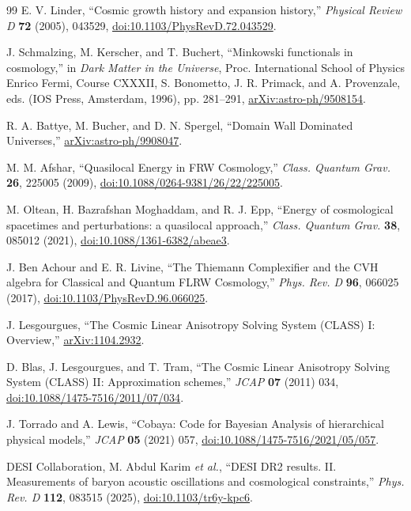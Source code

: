\documentclass[aps,prd,preprint,onecolumn,nofootinbib,superscriptaddress,showkeys]{revtex4-2}
\numberwithin{equation}{section}
\theoremstyle{definition}
\theoremstyle{plain}
\begin{document}
\begin{thebibliography}{99}
E. V. Linder, ``Cosmic growth history and expansion history,''
\emph{Physical Review D} \textbf{72} (2005), 043529,
\href{https://doi.org/10.1103/PhysRevD.72.043529}{doi:10.1103/PhysRevD.72.043529}.



J. Schmalzing, M. Kerscher, and T. Buchert,
``Minkowski functionals in cosmology,'' in \emph{Dark Matter in the Universe},
Proc. International School of Physics Enrico Fermi, Course CXXXII,
S. Bonometto, J. R. Primack, and A. Provenzale, eds. (IOS Press, Amsterdam, 1996), pp. 281--291,
\href{https://arxiv.org/abs/astro-ph/9508154}{arXiv:astro-ph/9508154}.

R. A. Battye, M. Bucher, and D. N. Spergel,
``Domain Wall Dominated Universes,''
\href{https://arxiv.org/abs/astro-ph/9908047}{arXiv:astro-ph/9908047}.

M. M. Afshar,
``Quasilocal Energy in FRW Cosmology,''
\emph{Class. Quantum Grav.} \textbf{26}, 225005 (2009),
\href{https://doi.org/10.1088/0264-9381/26/22/225005}{doi:10.1088/0264-9381/26/22/225005}.

M. Oltean, H. Bazrafshan Moghaddam, and R. J. Epp,
``Energy of cosmological spacetimes and perturbations: a quasilocal approach,''
\emph{Class. Quantum Grav.} \textbf{38}, 085012 (2021),
\href{https://doi.org/10.1088/1361-6382/abeae3}{doi:10.1088/1361-6382/abeae3}.

J. Ben Achour and E. R. Livine,
``The Thiemann Complexifier and the CVH algebra for Classical and Quantum FLRW Cosmology,''
\emph{Phys. Rev. D} \textbf{96}, 066025 (2017),
\href{https://doi.org/10.1103/PhysRevD.96.066025}{doi:10.1103/PhysRevD.96.066025}.

J. Lesgourgues,
``The Cosmic Linear Anisotropy Solving System (CLASS) I: Overview,''
\href{https://arxiv.org/abs/1104.2932}{arXiv:1104.2932}.

D. Blas, J. Lesgourgues, and T. Tram,
``The Cosmic Linear Anisotropy Solving System (CLASS) II: Approximation schemes,''
\emph{JCAP} \textbf{07} (2011) 034,
\href{https://doi.org/10.1088/1475-7516/2011/07/034}{doi:10.1088/1475-7516/2011/07/034}.

J. Torrado and A. Lewis,
``Cobaya: Code for Bayesian Analysis of hierarchical physical models,''
\emph{JCAP} \textbf{05} (2021) 057,
\href{https://doi.org/10.1088/1475-7516/2021/05/057}{doi:10.1088/1475-7516/2021/05/057}.

DESI Collaboration, M. Abdul Karim \emph{et al.},
``DESI DR2 results. II. Measurements of baryon acoustic oscillations and cosmological constraints,''
\emph{Phys. Rev. D} \textbf{112}, 083515 (2025),
\href{https://doi.org/10.1103/tr6y-kpc6}{doi:10.1103/tr6y-kpc6}.

\end{thebibliography}
\end{document}
